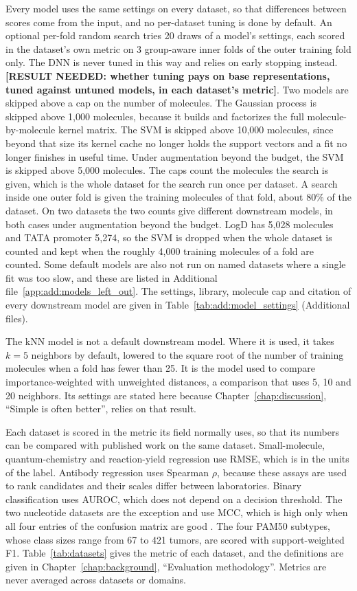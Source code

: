Every model uses the same settings on every dataset, so that differences between scores come from the input, and no per-dataset tuning is done by default. An optional per-fold random search tries 20 draws of a model's settings, each scored in the dataset's own metric on 3 group-aware inner folds of the outer training fold only. The DNN is never tuned in this way and relies on early stopping instead. \textbf{[RESULT NEEDED: whether tuning pays on base representations, tuned against untuned models, in each dataset's metric]}. Two models are skipped above a cap on the number of molecules. The Gaussian process is skipped above 1,000 molecules, because it builds and factorizes the full molecule-by-molecule kernel matrix. The SVM is skipped above 10,000 molecules, since beyond that size its kernel cache no longer holds the support vectors and a fit no longer finishes in useful time. Under augmentation beyond the budget, the SVM is skipped above 5,000 molecules. The caps count the molecules the search is given, which is the whole dataset for the search run once per dataset. A search inside one outer fold is given the training molecules of that fold, about 80\% of the dataset. On two datasets the two counts give different downstream models, in both cases under augmentation beyond the budget. LogD has 5,028 molecules and TATA promoter 5,274, so the SVM is dropped when the whole dataset is counted and kept when the roughly 4,000 training molecules of a fold are counted. Some default models are also not run on named datasets where a single fit was too slow, and these are listed in Additional file~\ref{app:add:models_left_out}. The settings, library, molecule cap and citation of every downstream model are given in Table~\ref{tab:add:model_settings} (Additional files).

The kNN model is not a default downstream model. Where it is used, it takes $k = 5$ neighbors by default, lowered to the square root of the number of training molecules when a fold has fewer than 25. It is the model used to compare importance-weighted with unweighted distances, a comparison that uses 5, 10 and 20 neighbors. Its settings are stated here because Chapter~\ref{chap:discussion}, ``Simple is often better'', relies on that result.

Each dataset is scored in the metric its field normally uses, so that its numbers can be compared with published work on the same dataset. Small-molecule, quantum-chemistry and reaction-yield regression use RMSE, which is in the units of the label. Antibody regression uses Spearman $\rho$, because these assays are used to rank candidates and their scales differ between laboratories. Binary classification uses AUROC, which does not depend on a decision threshold. The two nucleotide datasets are the exception and use MCC, which is high only when all four entries of the confusion matrix are good \citep{Chicco2020}. The four PAM50 subtypes, whose class sizes range from 67 to 421 tumors, are scored with support-weighted F1. Table~\ref{tab:datasets} gives the metric of each dataset, and the definitions are given in Chapter~\ref{chap:background}, ``Evaluation methodology''. Metrics are never averaged across datasets or domains.

